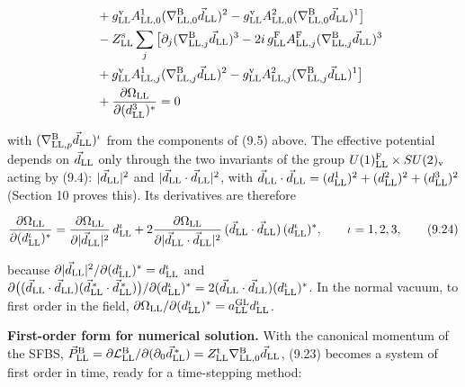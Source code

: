 \documentclass[
  10pt,
]{article}
\begin{document}
\[\begin{aligned}
&\quad +g^{\rm v}_{\rm LL}A^1_{{\rm LL},0}(\nabla^{\rm B}_{{\rm LL},0}\vec d_{\rm LL})^2-g^{\rm v}_{\rm LL}A^2_{{\rm LL},0}(\nabla^{\rm B}_{{\rm LL},0}\vec d_{\rm LL})^1\big]\\
&\quad-Z^{\rm s}_{\rm LL}\sum_j\big[\partial_j(\nabla^{\rm B}_{{\rm LL},j}\vec d_{\rm LL})^3-2i\,g^{\rm F}_{\rm LL}A^{\rm F}_{{\rm LL},j}(\nabla^{\rm B}_{{\rm LL},j}\vec d_{\rm LL})^3\\
&\quad +g^{\rm v}_{\rm LL}A^1_{{\rm LL},j}(\nabla^{\rm B}_{{\rm LL},j}\vec d_{\rm LL})^2-g^{\rm v}_{\rm LL}A^2_{{\rm LL},j}(\nabla^{\rm B}_{{\rm LL},j}\vec d_{\rm LL})^1\big]\\
&\quad+\frac{\partial\Omega_{\rm LL}}{\partial(d^3_{\rm LL})^*}=0\end{aligned}\]

with \((\nabla^{\rm B}_{{\rm LL},p}\vec d_{\rm LL})^\iota\) from the
components of (9.5) above. The effective potential depends on
\(\vec d_{\rm LL}\) only through the two invariants of the group
\(U(1)^{\rm F}_{\rm LL}\times SU(2)_{\rm v}\) acting by (9.4):
\(\lvert\vec d_{\rm LL}\rvert^2\) and
\(\lvert\vec d_{\rm LL}\cdot\vec d_{\rm LL}\rvert^2\), with
\(\vec d_{\rm LL}\cdot\vec d_{\rm LL}=(d^1_{\rm LL})^2+(d^2_{\rm LL})^2+(d^3_{\rm LL})^2\)
(Section 10 proves this). Its derivatives are therefore

\[\frac{\partial\Omega_{\rm LL}}{\partial(d^\iota_{\rm LL})^*}=\frac{\partial\Omega_{\rm LL}}{\partial\lvert\vec d_{\rm LL}\rvert^2}\,d^\iota_{\rm LL}+2\frac{\partial\Omega_{\rm LL}}{\partial\lvert\vec d_{\rm LL}\cdot\vec d_{\rm LL}\rvert^2}\,(\vec d_{\rm LL}\cdot\vec d_{\rm LL})\,(d^\iota_{\rm LL})^*,\qquad\iota=1,2,3,\tag{9.24}\]

because
\(\partial\lvert\vec d_{\rm LL}\rvert^2/\partial(d^\iota_{\rm LL})^*=d^\iota_{\rm LL}\)
and
\(\partial\big((\vec d_{\rm LL}\cdot\vec d_{\rm LL})(\vec d^{\,*}_{\rm LL}\cdot\vec d^{\,*}_{\rm LL})\big)/\partial(d^\iota_{\rm LL})^*=2(\vec d_{\rm LL}\cdot\vec d_{\rm LL})(d^\iota_{\rm LL})^*\).
In the normal vacuum, to first order in the field,
\(\partial\Omega_{\rm LL}/\partial(d^\iota_{\rm LL})^*=a^{\rm GL}_{\rm LL}d^\iota_{\rm LL}\).

\textbf{First-order form for numerical solution.} With the canonical
momentum of the SFBS,
\(\vec P^{\rm B}_{\rm LL}=\partial\mathcal L^{\rm B}_{\rm LL}/\partial(\partial_0\vec d^{\,*}_{\rm LL})=Z^{\rm t}_{\rm LL}\nabla^{\rm B}_{{\rm LL},0}\vec d_{\rm LL}\),
(9.23) becomes a system of first order in time, ready for a
time-stepping method:
\end{document}
